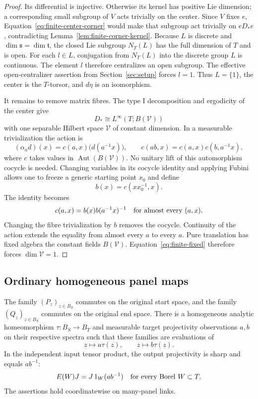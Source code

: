 \begin{proof}
Its differential is injective.  Otherwise its kernel has
positive Lie dimension; a corresponding small subgroup of $V$
acts trivially on the center.  Since $V$ fixes $e$,
Equation~\eqref{eq:finite-center-corner} would make that subgroup
act trivially on $eD_*e$, contradicting
Lemma~\ref{lem:finite-corner-kernel}.
Because $L$ is discrete and
$\dim\mathfrak s=\dim\mathfrak t$, the closed Lie subgroup
$N_T(L)$ has the full dimension of $T$ and is open.
For each $l\in L$, conjugation from $N_T(L)$ into the discrete
group $L$ is continuous.  The element $l$ therefore centralizes
an open subgroup.  The effective open-centralizer assertion from
Section~\ref{sec:setup} forces $l=1$.
Thus $L=\{1\}$, the center is the $T$-torsor, and $d\eta$ is an
isomorphism.

It remains to remove matrix fibres.  The type I decomposition
and ergodicity of the center give
\[
 D_*\cong L^\infty(T;B(\mathcal V))
\]
with one separable Hilbert space $\mathcal V$ of constant
dimension.  In a measurable trivialization the action is
\[
 (\alpha_a d)(x)=c(a,x)\bigl(d(a^{-1}x)\bigr),\qquad
 c(ab,x)=c(a,x)c(b,a^{-1}x),
\]
where $c$ takes values in $\operatorname{Aut}(B(\mathcal V))$.
No unitary lift of this automorphism cocycle is needed.
Changing variables in its cocycle identity and applying Fubini
allows one to freeze a generic starting point $x_0$ and define
\[
 b(x)=c(xx_0^{-1},x).
\]
The identity becomes
\[
 c(a,x)=b(x)b(a^{-1}x)^{-1}
 \quad\hbox{for almost every }(a,x).
\]
Changing the fibre trivialization by $b$ removes the cocycle.
Continuity of the action extends the equality from almost every
$a$ to every $a$.  Pure translation has fixed algebra the
constant fields $B(\mathcal V)$.  Equation~\eqref{eq:finite-fixed}
therefore forces $\dim\mathcal V=1$.
\end{proof}

\subsection{Ordinary homogeneous panel maps}

\begin{proposition}
\label{prop:finite-maps}
The family $(P_z)_{z\in B_S}$ commutes on the original start
space, and the family $(Q_z)_{z\in B_S}$ commutes on the original
end space.  There is a homogeneous analytic homeomorphism
$\tau:B_S\to B_T$ and measurable target projectivity observations
$a,b$ on their respective spectra such that these families are
evaluations of
\begin{equation}
 z\longmapsto a\tau(z),\qquad
 z\longmapsto b\tau(z).
 \label{eq:finite-panel-laws}
\end{equation}
In the independent input tensor product, the output projectivity
is sharp and equals $ab^{-1}$:
\begin{equation}
 E(W)J=J\,1_W(ab^{-1})
 \quad\hbox{for every Borel }W\subset T.
 \label{eq:finite-projectivity-sharp}
\end{equation}
The assertions hold coordinatewise on many-panel links.
\end{proposition}

